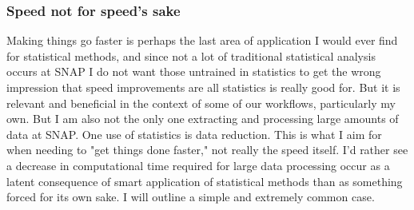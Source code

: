 \documentclass{article}\usepackage[]{graphicx}\usepackage[]{color}
\begin{document}
\subsubsection{Speed not for speed's sake}
Making things go faster is perhaps the last area of application I would ever find for statistical methods,
and since not a lot of traditional statistical analysis occurs at SNAP I do not want those untrained in statistics to get the wrong impression that speed improvements are all statistics is really good for.
But it is relevant and beneficial in the context of some of our workflows, particularly my own.
But I am also not the only one extracting and processing large amounts of data at SNAP.
One use of statistics is data reduction.
This is what I aim for when needing to "get things done faster," not really the speed itself.
I'd rather see a decrease in computational time required for large data processing occur as a latent consequence of smart application of statistical methods than as something forced for its own sake.
I will outline a simple and extremely common case.
\end{document}
